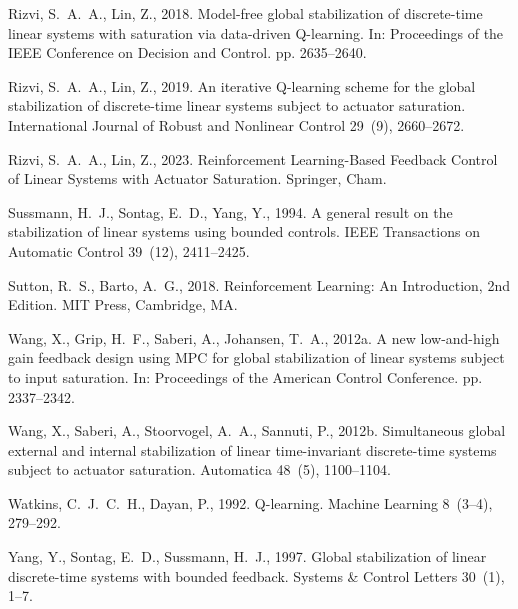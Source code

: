 \documentclass[final,5p,times,authoryear]{elsarticle}
\theoremstyle{plain}
\theoremstyle{definition}
\theoremstyle{remark}
\begin{document}
\begin{thebibliography}{}
Rizvi, S.~A.~A., Lin, Z., 2018. Model-free global stabilization of
discrete-time linear systems with saturation via data-driven
Q-learning. In: Proceedings of the IEEE Conference on Decision and
Control. pp. 2635--2640.

Rizvi, S.~A.~A., Lin, Z., 2019. An iterative Q-learning scheme for the
global stabilization of discrete-time linear systems subject to
actuator saturation. International Journal of Robust and Nonlinear
Control 29~(9), 2660--2672.

Rizvi, S.~A.~A., Lin, Z., 2023. Reinforcement Learning-Based Feedback
Control of Linear Systems with Actuator Saturation. Springer, Cham.

Sussmann, H.~J., Sontag, E.~D., Yang, Y., 1994. A general result on the
stabilization of linear systems using bounded controls. IEEE
Transactions on Automatic Control 39~(12), 2411--2425.

Sutton, R.~S., Barto, A.~G., 2018. Reinforcement Learning: An
Introduction, 2nd Edition. MIT Press, Cambridge, MA.

Wang, X., Grip, H.~F., Saberi, A., Johansen, T.~A., 2012a. A new
low-and-high gain feedback design using MPC for global stabilization of
linear systems subject to input saturation. In: Proceedings of the
American Control Conference. pp. 2337--2342.

Wang, X., Saberi, A., Stoorvogel, A.~A., Sannuti, P., 2012b.
Simultaneous global external and internal stabilization of linear
time-invariant discrete-time systems subject to actuator saturation.
Automatica 48~(5), 1100--1104.

Watkins, C.~J.~C.~H., Dayan, P., 1992. Q-learning. Machine Learning
8~(3--4), 279--292.

Yang, Y., Sontag, E.~D., Sussmann, H.~J., 1997. Global stabilization of
linear discrete-time systems with bounded feedback. Systems \& Control
Letters 30~(1), 1--7.

\end{thebibliography}
\endgroup
\end{document}
